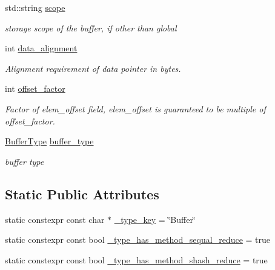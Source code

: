 \begin{DoxyCompactItemize}
std\+::string \hyperlink{classtvm_1_1tir_1_1BufferNode_ab2bdf8dc7bb079c7c12a484869af7e8b}{scope}
\begin{DoxyCompactList}\small\item\em storage scope of the buffer, if other than global \end{DoxyCompactList}\item 
int \hyperlink{classtvm_1_1tir_1_1BufferNode_aac30fc17abe8bde34272a854ba74b16a}{data\+\_\+alignment}
\begin{DoxyCompactList}\small\item\em Alignment requirement of data pointer in bytes. \end{DoxyCompactList}\item 
int \hyperlink{classtvm_1_1tir_1_1BufferNode_aa89852936d3a026cea1470c4c7f27488}{offset\+\_\+factor}
\begin{DoxyCompactList}\small\item\em Factor of elem\+\_\+offset field, elem\+\_\+offset is guaranteed to be multiple of offset\+\_\+factor. \end{DoxyCompactList}\item 
\hyperlink{namespacetvm_1_1tir_a9ac05a14db42ca73da1d3945e7ce2fd1}{Buffer\+Type} \hyperlink{classtvm_1_1tir_1_1BufferNode_a2ce595dfcf7a726c7e0f86a6942d2568}{buffer\+\_\+type}
\begin{DoxyCompactList}\small\item\em buffer type \end{DoxyCompactList}\end{DoxyCompactItemize}
\subsection*{Static Public Attributes}
\begin{DoxyCompactItemize}
\item 
static constexpr const char $\ast$ \hyperlink{classtvm_1_1tir_1_1BufferNode_a10305e404bd42b5b46ddb1944ce2c231}{\+\_\+type\+\_\+key} = \char`\"{}Buffer\char`\"{}
\item 
static constexpr const bool \hyperlink{classtvm_1_1tir_1_1BufferNode_a438cd7b650f50f8b55fbf0948494cdbe}{\+\_\+type\+\_\+has\+\_\+method\+\_\+sequal\+\_\+reduce} = true
\item 
static constexpr const bool \hyperlink{classtvm_1_1tir_1_1BufferNode_a99243a4cbf931616fc7193c9b8bfc511}{\+\_\+type\+\_\+has\+\_\+method\+\_\+shash\+\_\+reduce} = true
\end{DoxyCompactItemize}


